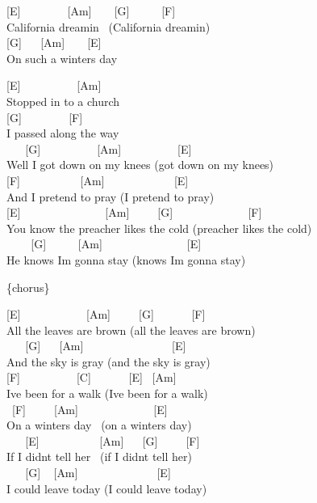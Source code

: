 \documentclass[
  letterpaper,
  twoside=false]{scrbook}
\begin{document}
{[}E{]} ~ ~ ~ ~ ~{[}Am{]} ~ ~ {[}G{]} ~ ~ ~ {[}F{]}\\
California dreamin ~(California dreamin\textquotesingle)\\
\hspace*{0.333em} {[}G{]} ~ ~{[}Am{]} ~ ~ {[}E{]}\\
On such a winter\textquotesingle s day

{[}E{]} ~ ~ ~ ~ ~ ~{[}Am{]}\\
Stopped in to a church\\
{[}G{]} ~ ~ ~ ~ ~{[}F{]}\\
I passed along the way\\
\hspace*{0.333em} ~ ~ {[}G{]} ~ ~ ~ ~ ~ ~{[}Am{]} ~ ~ ~ ~ ~ ~{[}E{]}\\
Well I got down on my knees (got down on my knees)\\
{[}F{]} ~ ~ ~ ~ ~ ~ {[}Am{]} ~ ~ ~ ~ ~ ~ ~ {[}E{]}\\
And I pretend to pray (I pretend to pray)\\
{[}E{]} ~ ~ ~ ~ ~ ~ ~ ~ ~{[}Am{]} ~ ~ ~{[}G{]} ~ ~ ~ ~ ~ ~ ~ ~{[}F{]}\\
You know the preacher likes the cold (preacher likes the cold)\\
\hspace*{0.333em} ~ ~ ~{[}G{]} ~ ~ ~ {[}Am{]} ~ ~ ~ ~ ~ ~ ~ ~ ~{[}E{]}\\
He knows I\textquotesingle m gonna stay (knows I\textquotesingle m gonna
stay)

\{chorus\}

{[}E{]} ~ ~ ~ ~ ~ ~ ~{[}Am{]} ~ ~ ~{[}G{]} ~ ~ ~ ~{[}F{]}\\
All the leaves are brown (all the leaves are brown)\\
\hspace*{0.333em} ~ ~ {[}G{]} ~ ~{[}Am{]} ~ ~ ~ ~ ~ ~ ~ ~ ~ {[}E{]}\\
And the sky is gray (and the sky is gray)\\
{[}F{]} ~ ~ ~ ~ ~ ~{[}C{]} ~ ~ ~ ~{[}E{]} ~{[}Am{]}\\
I\textquotesingle ve been for a walk (I\textquotesingle ve been for a
walk)\\
\hspace*{0.333em} ~{[}F{]} ~ ~ ~{[}Am{]} ~ ~ ~ ~ ~ ~ ~ ~{[}E{]}\\
On a winter\textquotesingle s day ~(on a winter\textquotesingle s day)\\
\hspace*{0.333em} ~ ~ {[}E{]} ~ ~ ~ ~ ~ ~ {[}Am{]} ~ ~{[}G{]} ~ ~
~{[}F{]}\\
If I didn\textquotesingle t tell her ~(if I didn\textquotesingle t tell
her)\\
\hspace*{0.333em} ~ ~ {[}G{]} ~ {[}Am{]} ~ ~ ~ ~ ~ ~ ~ ~ {[}E{]}\\
I could leave today (I could leave today)
\end{document}

